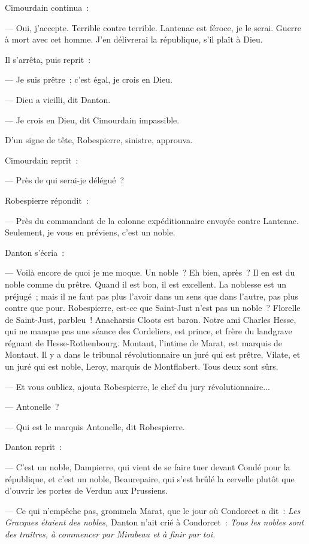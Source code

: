\documentclass[french,twoside]{book} %
\begin{document}
 Cimourdain continua :\par
— Oui, j’accepte. Terrible contre terrible. Lantenac est féroce, je le serai. Guerre à mort avec cet homme. J’en délivrerai la république, s’il plaît à Dieu.\par
Il s’arrêta, puis reprit :\par
— Je suis prêtre ; c’est égal, je crois en Dieu.\par
— Dieu a vieilli, dit Danton.\par
— Je crois en Dieu, dit Cimourdain impassible.\par
D’un signe de tête, Robespierre, sinistre, approuva.\par
Cimourdain reprit :\par
— Près de qui serai-je délégué ?\par
Robespierre répondit :\par
— Près du commandant de la colonne expéditionnaire envoyée contre Lantenac. Seulement, je vous en préviens, c’est un noble.\par
Danton s’écria :\par
— Voilà encore de quoi je me moque. Un noble ? Eh bien, après ? Il en est du noble comme du prêtre. Quand il est bon, il est excellent. La noblesse est un préjugé ; mais il ne faut pas plus l’avoir dans un sens que dans l’autre, pas plus contre que pour. Robespierre, est-ce que Saint-Just n’est pas un noble ? Florelle de Saint-Just, parbleu ! Anacharsis Cloots est baron. Notre ami Charles Hesse, qui ne manque pas une séance des Cordeliers, est prince, et frère du landgrave régnant de Hesse-Rothenbourg. Montaut, l’intime de Marat, est marquis de Montaut. Il y a dans le tribunal révolutionnaire un juré qui est prêtre, Vilate, et un juré qui est noble, Leroy, marquis de Montflabert. Tous deux sont sûrs.\par
 — Et vous oubliez, ajouta Robespierre, le chef du jury révolutionnaire...\par
— Antonelle ?\par
— Qui est le marquis Antonelle, dit Robespierre.\par
Danton reprit :\par
— C’est un noble, Dampierre, qui vient de se faire tuer devant Condé pour la république, et c’est un noble, Beaurepaire, qui s’est brûlé la cervelle plutôt que d’ouvrir les portes de Verdun aux Prussiens.\par
— Ce qui n’empêche pas, grommela Marat, que le jour où Condorcet a dit : \emph{Les Gracques étaient des nobles,} Danton n’ait crié à Condorcet : \emph{Tous les nobles sont des traîtres, à commencer par Mirabeau et à finir par toi.}\par
\end{document}
